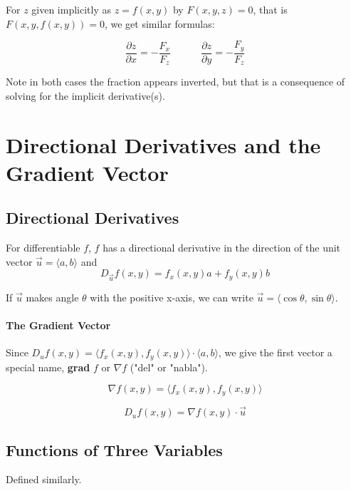 \documentclass{report}  %
\begin{document}
For $z$ given implicitly as $z = f(x, y)$ by $F(x, y, z) = 0$, that is $F(x, y, f(x, y)) = 0$, we get similar formulas: 

\begin{equation}
	\frac{\partial z}{\partial x} = - \frac{F_x}{F_z}
	\qquad \quad
	\frac{\partial z}{\partial y} = - \frac{F_y}{F_z}
\end{equation}

Note in both cases the fraction appears inverted, but that is a consequence of solving for the implicit derivative(s).

\newpage

\section{Directional Derivatives and the Gradient Vector}
\subsection*{Directional Derivatives}

For differentiable $f$, $f$ has a directional derivative in the direction of the unit vector $\vec{u} = \langle a, b \rangle$ and 
\begin{equation}
	D_{\vec{u}} f(x, y) = f_x (x, y)a + f_y (x, y)b
\end{equation}

If $\vec{u}$ makes angle $\theta$ with the positive x-axis, we can write $\vec{u} = \langle \cos \theta , \sin \theta \rangle$.

\paragraph{The Gradient Vector}
Since $D_u f(x, y) = \langle f_x (x, y), f_y (x, y) \rangle \cdot \langle a, b \rangle$,
we give the first vector a special name, \textbf{grad} $f$ or $\nabla f$ ("del" or "nabla"). 

\begin{equation}
	\nabla f(x, y) = \langle f_x (x, y), f_y (x, y) \rangle
\end{equation}

\begin{equation}
	D_u f(x, y) = \nabla f(x, y) \cdot \vec{u}
\end{equation}

\subsection*{Functions of Three Variables}
Defined similarly. 
\end{document}
